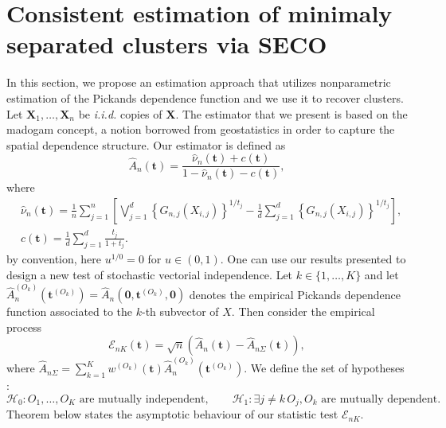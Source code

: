 \documentclass[11pt]{article}
\begin{document}
	\section{Consistent estimation of minimaly separated clusters via SECO}
	\label{sec:estimation}
	In this section, we propose an estimation approach that utilizes nonparametric estimation of the Pickands dependence function and we use it to recover clusters.
	Let $\textbf{X}_1, \dots, \textbf{X}_n$ be \emph{i.i.d.} copies of $\textbf{X}$. The estimator that we present is based on the madogam concept, a notion borrowed from geostatistics in order to capture the spatial dependence structure. Our estimator is defined as 
	\begin{equation}
		\hat{A}_n(\textbf{t}) = \frac{\hat{\nu}_n(\textbf{t}) + c(\textbf{t})}{1-\hat{\nu}_n(\textbf{t})-c(\textbf{t})},
	\end{equation}
	where
	\begin{align*}
		& \hat{\nu}_n(\textbf{t}) = \frac{1}{n} \sum_{j=1}^n \left[\bigvee_{j=1}^d \left\{ G_{n,j} (X_{i,j}) \right\}^{1/t_j} - \frac{1}{d} \sum_{j=1}^d \left\{ G_{n,j}(X_{i,j}) \right\}^{1/t_j} \right], \\
		& c(\textbf{t}) = \frac{1}{d} \sum_{j=1}^d \frac{t_j}{1+t_j}.
	\end{align*}
	by convention, here $u^{1/0} = 0$ for $u \in (0,1)$. One can use our results presented to design a new test of stochastic vectorial independence. Let $k\in\{1,\dots,K\}$ and let $\hat{A}_{n}^{(O_k)}(\textbf{t}^{(O_k)}) = \hat{A}_n(\textbf{0},\textbf{t}^{(O_k)}, \textbf{0})$ denotes the empirical Pickands dependence function associated to the $k$-th subvector of $X$. Then consider the empirical process
	\begin{equation}
		\mathcal{E}_{nK} (\textbf{t}) = \sqrt{n}\left(\hat{A}_n(\textbf{t}) - \hat{A}_{n\Sigma}(\textbf{t}) \right),
	\end{equation}
	where $\hat{A}_{n\Sigma} = \sum_{k=1}^K w^{(O_k)}(\textbf{t}) \hat{A}_{n}^{(O_k)}(\textbf{t}^{(O_k)})$. We define the set of hypotheses :
	\begin{equation*}
		\mathcal{H}_0 : O_1, \dots, O_K \textrm{ are mutually independent}, \quad \quad \mathcal{H}_1 : \exists j \neq k \, O_j, O_k \textrm{ are mutually dependent}.
	\end{equation*}
	Theorem below states the asymptotic behaviour of our statistic test $\mathcal{E}_{nK}$.
\end{document}
